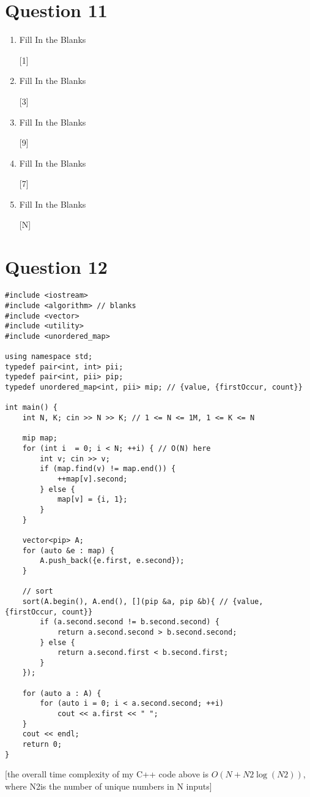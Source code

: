 \documentclass{article}
\begin{document}
\section{Question 11}
\begin{enumerate}[label=(\arabic*)]
\item Fill In the Blanks

[1]
\item Fill In the Blanks

[3]
\item Fill In the Blanks

[9]
\item Fill In the Blanks

[7]
\item Fill In the Blanks

[N]
\end{enumerate}

\section{Question 12}
\begin{verbatim}
#include <iostream>
#include <algorithm> // blanks
#include <vector>
#include <utility>
#include <unordered_map>

using namespace std;
typedef pair<int, int> pii;
typedef pair<int, pii> pip;
typedef unordered_map<int, pii> mip; // {value, {firstOccur, count}}

int main() {
    int N, K; cin >> N >> K; // 1 <= N <= 1M, 1 <= K <= N

    mip map;
    for (int i  = 0; i < N; ++i) { // O(N) here
        int v; cin >> v;
        if (map.find(v) != map.end()) {
            ++map[v].second;
        } else {
            map[v] = {i, 1};
        }
    }

    vector<pip> A;
    for (auto &e : map) {
        A.push_back({e.first, e.second});
    }

    // sort
    sort(A.begin(), A.end(), [](pip &a, pip &b){ // {value, {firstOccur, count}}
        if (a.second.second != b.second.second) {
            return a.second.second > b.second.second;
        } else {
            return a.second.first < b.second.first;
        }
    });

    for (auto a : A) {
        for (auto i = 0; i < a.second.second; ++i)
            cout << a.first << " ";
    }
    cout << endl;
    return 0;
}
\end{verbatim}
[the overall time complexity of my C++ code above is $O(N + N2 \log(N2))$, where N2is the number of unique numbers in N inputs]
\end{document}
